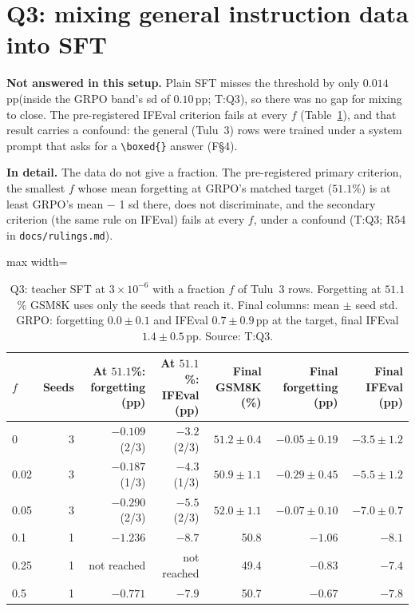 \documentclass[11pt]{article}
\newcommand{\pp}{\,pp\xspace}
\newcommand{\T}[1]{\textsf{T:#1}}
\newcommand{\F}[1]{\textsf{F\S#1}}
\begin{document}
\section{Q3: mixing general instruction data into SFT}
\label{sec:q3}
\textbf{Not answered in this setup.} Plain SFT misses the threshold by only $0.014$\pp (inside the GRPO band's sd of
$0.10$\pp; \T{Q3}), so there was no gap for mixing to close. The pre-registered IFEval criterion fails at every $f$
(Table~\ref{tab:q3}), and that result carries a confound: the general (Tulu~3) rows were trained under a system prompt
that asks for a \texttt{\textbackslash boxed\{\}} answer (\F{4}).

\textbf{In detail.} The data do not give a fraction. The pre-registered primary criterion, the smallest $f$ whose mean
forgetting at GRPO's matched target ($51.1$\%) is at least GRPO's mean $-$ 1 sd there, does not discriminate, and the
secondary criterion (the same rule on IFEval) fails at every $f$, under a confound (\T{Q3}; R54 in
\texttt{docs/rulings.md}).

\begin{table}[!htb]
\centering\small
\caption{Q3: teacher SFT at $3\times10^{-6}$ with a fraction $f$ of Tulu~3 rows. Forgetting at $51.1$\% GSM8K uses
only the seeds that reach it. Final columns: mean $\pm$ seed std. GRPO: forgetting $0.0 \pm 0.1$ and IFEval
$0.7 \pm 0.9$\pp at the target, final IFEval $1.4 \pm 0.5$\pp. Source: \T{Q3}.}
\label{tab:q3}
\begin{adjustbox}{max width=\linewidth}
\begin{tabular}{lrrrrrr}
\toprule
$f$ & Seeds & At $51.1$\%: forgetting (pp) & At $51.1$\%: IFEval (pp) & Final GSM8K (\%) & Final forgetting (pp)
& Final IFEval (pp)\\
\midrule
0 & 3 & $-0.109$ (2/3) & $-3.2$ (2/3) & $51.2 \pm 0.4$ & $-0.05 \pm 0.19$ & $-3.5 \pm 1.2$\\
0.02 & 3 & $-0.187$ (1/3) & $-4.3$ (1/3) & $50.9 \pm 1.1$ & $-0.29 \pm 0.45$ & $-5.5 \pm 1.2$\\
0.05 & 3 & $-0.290$ (2/3) & $-5.5$ (2/3) & $52.0 \pm 1.1$ & $-0.07 \pm 0.10$ & $-7.0 \pm 0.7$\\
0.1 & 1 & $-1.236$ & $-8.7$ & 50.8 & $-1.06$ & $-8.1$\\
0.25 & 1 & not reached & not reached & 49.4 & $-0.83$ & $-7.4$\\
0.5 & 1 & $-0.771$ & $-7.9$ & 50.7 & $-0.67$ & $-7.8$\\
\bottomrule
\end{tabular}
\end{adjustbox}
\end{table}
\end{document}
